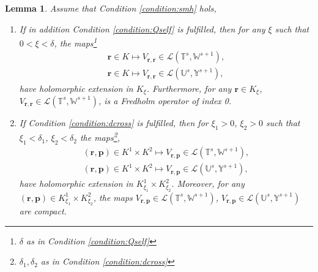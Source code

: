 \documentclass{article}
\newtheorem{lemma}[theorem]{Lemma}
\newcommand{\IU}{{\mathbb U}}
\newcommand{\IT}{{\mathbb T}}
\newcommand{\IW}{{\mathbb W}}
\newcommand{\IY}{{\mathbb Y}}
\newcommand{\bp}{{\bm p}}
\newcommand{\br}{\bm{r}}
\begin{document}
\begin{lemma}
\label{lemma:vcomp} 
Assume that Condition \ref{condition:smh} hols, 
\begin{enumerate}
\item If in addition Condition \ref{condition:Qself} is fulfilled, then for any $\xi$ such that $0<\xi < \delta$, the maps\footnote{$\delta$ as in Condition \ref{condition:Qself}}
\begin{align*}
\br \in K \mapsto V_{\br,\br} \in 
\mathcal{L}(\IT^s, \IW^{s+1}), \\
\br \in K \mapsto V_{\br,\br} \in 
\mathcal{L}(\IU^s, \IY^{s+1}),
\end{align*}
have holomorphic extension in $K_\xi$. Furthermore, for any $\br \in K_\xi$, $V_{\br,\br} \in \mathcal{L}(\IT^s, \IW^{s+1})$, is a Fredholm operator of index 0.
\item 
If Condition \ref{condition:dcross} is fulfilled, then for $\xi_1 >0$, $\xi_2 >0$ such that $\xi_1 < \delta_1$, $\xi_2 < \delta_2$ the maps\footnote{$\delta_1,\delta_2$ as in Condition \ref{condition:dcross}},
 \begin{align*}
 (\br,\bp) \in K^1 \times K^2 \mapsto V_{\br,\bp} \in 
\mathcal{L}(\IT^s, \IW^{s+1}),\\
 (\br,\bp) \in K^1 \times K^2 \mapsto V_{\br,\bp} \in 
\mathcal{L}(\IU^s, \IY^{s+1}),
\end{align*}
have holomorphic extension in $K^1_{\xi_1} \times K^2_{\xi_2}$. Moreover, for any $(\br,\bp) \in K^1_{\xi_1} \times K^2_{\xi_2}$, the maps $V_{\br,\bp} \in \mathcal{L}(\IT^s, \IW^{s+1})$, $V_{\br,\bp} \in \mathcal{L}(\IU^s, \IY^{s+1})$ are compact. 
\end{enumerate}
\end{lemma}
\end{document}
